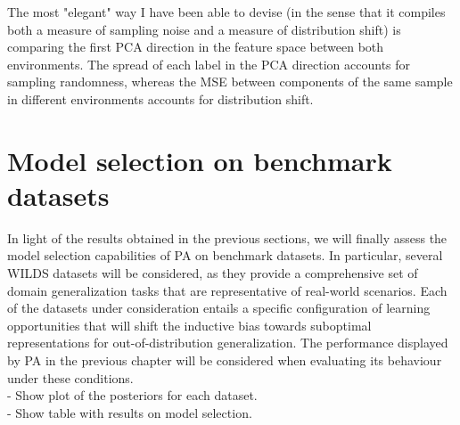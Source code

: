 The most "elegant" way I have been able to devise (in the sense that it compiles both a measure of sampling noise and a measure of distribution shift) is comparing the first PCA direction in the feature space between both environments. The spread of each label in the PCA direction accounts for sampling randomness, whereas the MSE between components of the same sample in different environments accounts for distribution shift.



 \section{Model selection on benchmark datasets}

In light of the results obtained in the previous sections, we will finally assess the model selection
capabilities of PA on benchmark datasets. In particular, several WILDS 
\cite{kohWILDSBenchmarkIntheWild2021} datasets will be considered, as they provide a comprehensive
set of domain generalization tasks that are representative of real-world scenarios. Each of the
datasets under consideration entails a specific configuration of learning opportunities that will
shift the inductive bias towards suboptimal representations for out-of-distribution
generalization. The performance displayed by PA in the previous chapter will be considered when
evaluating its behaviour under these conditions.\\


 - Show plot of the posteriors for each dataset. \\
 - Show table with results on model selection. \\

 \cleardoublepage
